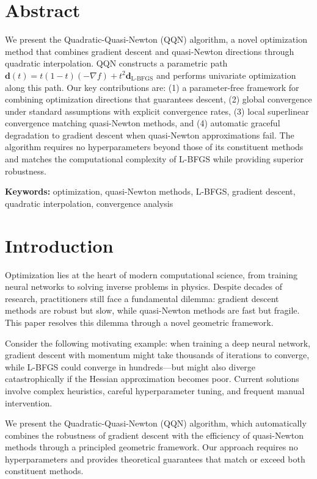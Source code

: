 \hypertarget{abstract}{%
\section{Abstract}\label{abstract}}

We present the Quadratic-Quasi-Newton (QQN) algorithm, a novel optimization method that combines gradient descent and quasi-Newton directions through quadratic interpolation. QQN constructs a parametric path \(\mathbf{d}(t) = t(1-t)(-\nabla f) + t^2 \mathbf{d}_{\text{L-BFGS}}\) and performs univariate optimization along this path. Our key contributions are: (1) a parameter-free framework for combining optimization directions that guarantees descent, (2) global convergence under standard assumptions with explicit convergence rates, (3) local superlinear convergence matching quasi-Newton methods, and (4) automatic graceful degradation to gradient descent when quasi-Newton approximations fail. The algorithm requires no hyperparameters beyond those of its constituent methods and matches the computational complexity of L-BFGS while providing superior robustness.

\textbf{Keywords:} optimization, quasi-Newton methods, L-BFGS, gradient descent, quadratic interpolation, convergence analysis

\hypertarget{introduction}{%
\section{Introduction}\label{introduction}}

Optimization lies at the heart of modern computational science, from training neural networks to solving inverse problems in physics. Despite decades of research, practitioners still face a fundamental dilemma: gradient descent methods are robust but slow, while quasi-Newton methods are fast but fragile. This paper resolves this dilemma through a novel geometric framework.

Consider the following motivating example: when training a deep neural network, gradient descent with momentum might take thousands of iterations to converge, while L-BFGS could converge in hundreds---but might also diverge catastrophically if the Hessian approximation becomes poor. Current solutions involve complex heuristics, careful hyperparameter tuning, and frequent manual intervention.

We present the Quadratic-Quasi-Newton (QQN) algorithm, which automatically combines the robustness of gradient descent with the efficiency of quasi-Newton methods through a principled geometric framework. Our approach requires no hyperparameters and provides theoretical guarantees that match or exceed both constituent methods.

